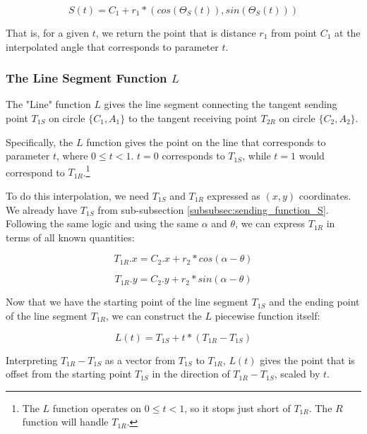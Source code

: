 \documentclass{article}
\begin{document}
\begin{equation}
    \label{eq:S(t)}
    S(t) = C_1 + r_1 * ( cos( \Theta_S(t) ),  sin( \Theta_S(t) ) )
\end{equation}

That is, for a given $t$, we return the point that is distance $r_1$ from point $C_1$ at the interpolated angle that corresponds to parameter $t$.


\subsubsection{The Line Segment Function $L$}
\label{subsubsec:line_segment_function_L}
The "Line" function $L$ gives the line segment connecting the tangent sending point $T_{1S}$ on circle $\{C_1, A_1\}$ to the tangent receiving point $T_{2R}$ on circle $\{C_2, A_2\}$.

Specifically, the $L$ function gives the point on the line that corresponds to parameter $t$, where $0 \leq t < 1$. $t = 0$ corresponds to $T_{1S}$, while $t = 1$ would correspond to $T_{1R}$.\footnote{The $L$ function operates on $0 \leq t < 1$, so it stops just short of $T_{1R}$. The $R$ function will handle $T_{1R}$.}

To do this interpolation, we need $T_{1S}$ and $T_{1R}$ expressed as $(x,y)$ coordinates. We already have $T_{1S}$ from sub-subsection \ref{subsubsec:sending_function_S}. Following the same logic and using the same $\alpha$ and $\theta$, we can express $T_{1R}$ in terms of all known quantities:

\begin{equation}
    \label{eq:T_1R.x}
    T_{1R}.x = C_2.x + r_2 * cos(\alpha - \theta)
\end{equation}

\begin{equation}
    \label{eq:T_1R.y}
    T_{1R}.y = C_2.y + r_2 * sin(\alpha - \theta)
\end{equation}

Now that we have the starting point of the line segment $T_{1S}$ and the ending point of the line segment $T_{1R}$, we can construct the $L$ piecewise function itself:

\begin{equation}
    \label{eq:L(t)}
    L(t) = T_{1S} + t * ( T_{1R} - T_{1S} )
\end{equation}

Interpreting $T_{1R} - T_{1S}$ as a vector from $T_{1S}$ to $T_{1R}$, $L(t)$ gives the point that is offset from the starting point $T_{1S}$ in the direction of $T_{1R} - T_{1S}$, scaled by $t$.
\end{document}
